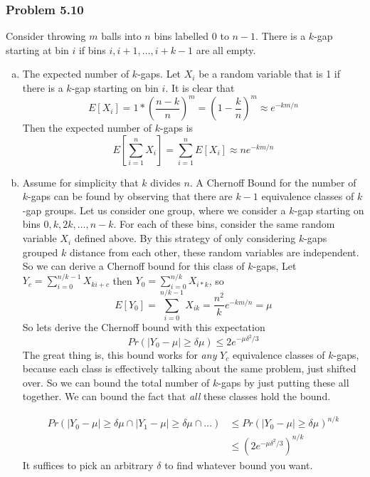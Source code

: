 \documentclass[12pt,letterpaper]{article}
\newenvironment{answer}[1]{
  \subsubsection*{Problem #1}
}{\newpage}
\begin{document}
\begin{answer}{5.10}
Consider throwing $m$ balls into $n$ bins labelled $0$ to $n-1$. There is a $k$-gap starting at bin $i$ if bins $i,i+1, \ldots,i+k - 1$ are all empty.
\begin{enumerate}[(a)]
	\item The expected number of $k$-gaps. Let $X_i$ be a random variable that is 1 if there is a $k$-gap starting on bin $i$. It is clear that
		$$ E[X_i] = 1 * \left( \frac{n - k}{n} \right)^m = (1 - \frac{k}{n})^m  \approx e^{-km/n}$$
		Then the expected number of $k$-gaps is
			$$E\left[ \sum_{i=1}^n X_i \right] = \sum_{i=1}^n E[X_i] \approx ne^{-km/n}$$
	\item Assume for simplicity that $k$ divides $n$. A Chernoff Bound for the number of $k$-gaps can be found by observing that there are $k-1$ equivalence classes of $k$-gap groups. Let us consider one group, where we consider a $k$-gap starting on bins $0, k, 2k, \ldots, n-k$. For each of these bins, consider the same random variable $X_i$ defined above. By this strategy of only considering $k$-gaps grouped $k$ distance from each other, these random variables are independent. So we can derive a Chernoff bound for this class of $k$-gaps, Let $Y_c = \sum_{i=0}^{n/k - 1} X_{ki + c}$ then $Y_0 = \sum_{i = 0}^{n/k} X_{i*k}$, so
		$$ E[Y_0] = \sum_{i=0}^{n/k - 1} X_{ik} = \frac{n^2}{k}e^{-km/n} = \mu $$
		So lets derive the Chernoff bound with this expectation
		$$ Pr(|Y_0 - \mu| \ge \delta \mu) \le 2e^{-\mu \delta^2 / 3} $$
		The great thing is, this bound works for \emph{any} $Y_c$ equivalence classes of $k$-gaps, because each class is effectively talking about the same problem, just shifted over. So we can bound the total number of $k$-gaps by just putting these all together. We can bound the fact that \emph{all} these classes hold the bound.

		\begin{align*}
		Pr(|Y_0 - \mu| \ge \delta \mu \cap |Y_1 - \mu | \ge \delta \mu \cap \ldots) &\le Pr(|Y_0 - \mu| \ge \delta \mu)^{n/k}\\
			&\le \left(2e^{-\mu \delta^2 /3}\right)^{n/k}
		\end{align*}
		It suffices to pick an arbitrary $\delta$ to find whatever bound you want.
\end{enumerate}
\end{answer}
\end{document}
